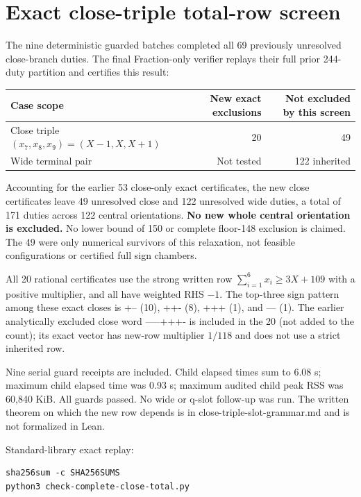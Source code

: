 \documentclass[
  11pt,
]{article}
\begin{document}
\section{Exact close-triple total-row
screen}\label{exact-close-triple-total-row-screen}

The nine deterministic guarded batches completed all 69 previously
unresolved close-branch duties. The final Fraction-only verifier replays
their full prior 244-duty partition and certifies this result:

\begin{longtable}[]{@{}lrr@{}}
\toprule\noalign{}
Case scope & New exact exclusions & Not excluded by this screen \\
\midrule\noalign{}
\endhead
\bottomrule\noalign{}
\endlastfoot
Close triple \((x_7,x_8,x_9)=(X-1,X,X+1)\) & 20 & 49 \\
Wide terminal pair & Not tested & 122 inherited \\
\end{longtable}

Accounting for the earlier 53 close-only exact certificates, the new
close certificates leave 49 unresolved close and 122 unresolved wide
duties, a total of 171 duties across 122 central orientations.
\textbf{No new whole central orientation is excluded.} No lower bound of
150 or complete floor-148 exclusion is claimed. The 49 were only
numerical survivors of this relaxation, not feasible configurations or
certified full sign chambers.

All 20 rational certificates use the strong written row
\(\sum_{i=1}^6 x_i\ge3X+109\) with a positive multiplier, and all have
weighted RHS \(-1\). The top-three sign pattern among these exact closes
is +-- (10), ++- (8), +++ (1), and --- (1). The earlier analytically
excluded close word -----+++- is included in the 20 (not added to the
count); its exact vector has new-row multiplier \(1/118\) and does not
use a strict inherited row.

Nine serial guard receipts are included. Child elapsed times sum to 6.08
s; maximum child elapsed time was 0.93 s; maximum audited child peak RSS
was 60,840 KiB. All guards passed. No wide or q-slot follow-up was run.
The written theorem on which the new row depends is in
close-triple-slot-grammar.md and is not formalized in Lean.

Standard-library exact replay:

\begin{verbatim}
sha256sum -c SHA256SUMS
python3 check-complete-close-total.py
\end{verbatim}
\end{document}

